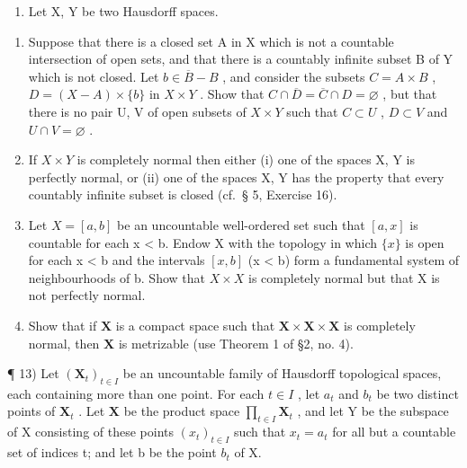 \begin{enumerate}
\def\labelenumi{\arabic{enumi})}
\setcounter{enumi}{11}
\tightlist
\item
  Let X, Y be two Hausdorff spaces.
\end{enumerate}

\begin{enumerate}
\def\labelenumi{\alph{enumi})}
\item
  Suppose that there is a closed set A in X which is not a countable intersection of open sets, and that there is a countably infinite subset B of Y which is not closed. Let \(b \in \overline{B} - B\) , and consider the subsets \(C = A \times B\) , \(D = (X - A) \times \{b\}\) in \(X \times Y\) . Show that \(C \cap \overline{D} = \overline{C} \cap D = \varnothing\) , but that there is no pair U, V of open subsets of \(X \times Y\) such that \(C \subset U\) , \(D \subset V\) and \(U \cap V = \varnothing\) .
\item
  If \(X \times Y\) is completely normal then either (i) one of the spaces X, Y is perfectly normal, or (ii) one of the spaces X, Y has the property that every countably infinite subset is closed (cf.~§ 5, Exercise 16).
\item
  Let \(X = [a, b]\) be an uncountable well-ordered set such that \([a, x]\) is countable for each x \textless{} b. Endow X with the topology in which \(\{x\}\) is open for each x \textless{} b and the intervals \([x, b]\) (x \textless{} b) form a fundamental system of neighbourhoods of b. Show that \(X \times X\) is completely normal but that X is not perfectly normal.
\item
  Show that if \(\mathbf{X}\) is a compact space such that \(\mathbf{X} \times \mathbf{X} \times \mathbf{X}\) is completely normal, then \(\mathbf{X}\) is metrizable (use Theorem 1 of §2, no. 4).
\end{enumerate}

¶ 13) Let \((\mathbf{X}_{t})_{t\in I}\) be an uncountable family of Hausdorff topological spaces, each containing more than one point. For each \(t\in I\) , let \(a_{t}\) and \(b_{t}\) be two distinct points of \(\mathbf{X}_{t}\) . Let \(\mathbf{X}\) be the product space \(\prod_{t\in I}\mathbf{X}_{t}\) , and let Y be the subspace of X consisting of these points \((x_{t})_{t\in I}\) such that \(x_{t}=a_{t}\) for all but a countable set of indices t; and let b be the point \(b_{t}\) of X.

